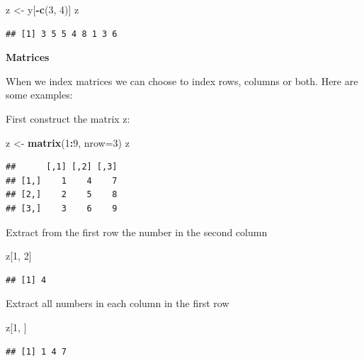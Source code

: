 \documentclass[
]{book}
\newenvironment{Shaded}{\begin{snugshade}}{\end{snugshade}}
\newcommand{\DataTypeTok}[1]{\textcolor[rgb]{0.13,0.29,0.53}{#1}}
\newcommand{\DecValTok}[1]{\textcolor[rgb]{0.00,0.00,0.81}{#1}}
\newcommand{\KeywordTok}[1]{\textcolor[rgb]{0.13,0.29,0.53}{\textbf{#1}}}
\newcommand{\NormalTok}[1]{#1}
\newcommand{\OperatorTok}[1]{\textcolor[rgb]{0.81,0.36,0.00}{\textbf{#1}}}
\newcommand{\StringTok}[1]{\textcolor[rgb]{0.31,0.60,0.02}{#1}}
\begin{document}
\begin{Shaded}
\begin{Highlighting}[]
\NormalTok{z <-}\StringTok{ }\NormalTok{y[}\OperatorTok{-}\KeywordTok{c}\NormalTok{(}\DecValTok{3}\NormalTok{, }\DecValTok{4}\NormalTok{)]}
\NormalTok{z}
\end{Highlighting}
\end{Shaded}

\begin{verbatim}
## [1] 3 5 5 4 8 1 3 6
\end{verbatim}

\textbf{Matrices}

When we index matrices we can choose to index rows, columns or both.
Here are some examples:

First construct the matrix z:

\begin{Shaded}
\begin{Highlighting}[]
\NormalTok{z <-}\StringTok{ }\KeywordTok{matrix}\NormalTok{(}\DecValTok{1}\OperatorTok{:}\DecValTok{9}\NormalTok{, }\DataTypeTok{nrow=}\DecValTok{3}\NormalTok{)}
\NormalTok{z}
\end{Highlighting}
\end{Shaded}

\begin{verbatim}
##      [,1] [,2] [,3]
## [1,]    1    4    7
## [2,]    2    5    8
## [3,]    3    6    9
\end{verbatim}

Extract from the first row the number in the second column

\begin{Shaded}
\begin{Highlighting}[]
\NormalTok{z[}\DecValTok{1}\NormalTok{, }\DecValTok{2}\NormalTok{]}
\end{Highlighting}
\end{Shaded}

\begin{verbatim}
## [1] 4
\end{verbatim}

Extract all numbers in each column in the first row

\begin{Shaded}
\begin{Highlighting}[]
\NormalTok{z[}\DecValTok{1}\NormalTok{, ]}
\end{Highlighting}
\end{Shaded}

\begin{verbatim}
## [1] 1 4 7
\end{verbatim}
\end{document}
